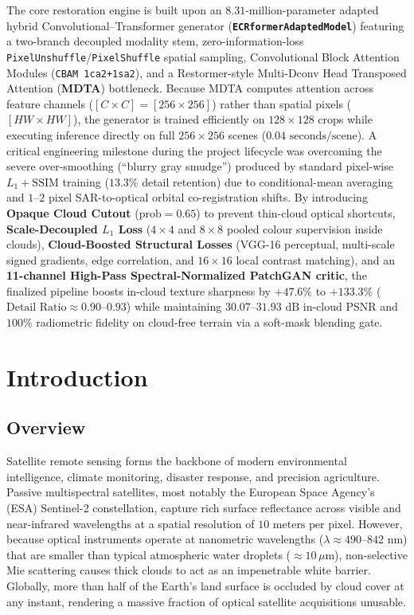 \documentclass[12pt,a4paper]{report}
\begin{document}
The core restoration engine is built upon an $8.31$-million-parameter adapted hybrid Convolutional--Transformer generator (\textbf{\texttt{ECRformerAdaptedModel}}) featuring a two-branch decoupled modality stem, zero-information-loss \texttt{PixelUnshuffle}/\texttt{PixelShuffle} spatial sampling, Convolutional Block Attention Modules (\texttt{CBAM 1ca2+1sa2}), and a Restormer-style Multi-Dconv Head Transposed Attention (\textbf{MDTA}) bottleneck. Because MDTA computes attention across feature channels ($[C\times C] = [256\times 256]$) rather than spatial pixels ($[HW\times HW]$), the generator is trained efficiently on $128\times 128$ crops while executing inference directly on full $256\times 256$ scenes ($0.04\text{ seconds/scene}$). A critical engineering milestone during the project lifecycle was overcoming the severe over-smoothing (``blurry gray smudge'') produced by standard pixel-wise $L_1 + \text{SSIM}$ training ($13.3\%$ detail retention) due to conditional-mean averaging and $1$--$2\text{ pixel}$ SAR-to-optical orbital co-registration shifts. By introducing \textbf{Opaque Cloud Cutout} ($\text{prob}=0.65$) to prevent thin-cloud optical shortcuts, \textbf{Scale-Decoupled $L_1$ Loss} ($4\times 4$ and $8\times 8$ pooled colour supervision inside clouds), \textbf{Cloud-Boosted Structural Losses} (VGG-16 perceptual, multi-scale signed gradients, edge correlation, and $16\times 16$ local contrast matching), and an \textbf{11-channel High-Pass Spectral-Normalized PatchGAN critic}, the finalized pipeline boosts in-cloud texture sharpness by $+47.6\%$ to $+133.3\%$ ($\text{Detail Ratio} \approx 0.90$--$0.93$) while maintaining $30.07$--$31.93\text{ dB}$ in-cloud PSNR and $100\%$ radiometric fidelity on cloud-free terrain via a soft-mask blending gate.

\newpage

\chapter{Introduction}

\section{Overview}
Satellite remote sensing forms the backbone of modern environmental intelligence, climate monitoring, disaster response, and precision agriculture. Passive multispectral satellites, most notably the European Space Agency's (ESA) Sentinel-2 constellation, capture rich surface reflectance across visible and near-infrared wavelengths at a spatial resolution of $10\text{ meters per pixel}$. However, because optical instruments operate at nanometric wavelengths ($\lambda \approx 490$--$842\text{ nm}$) that are smaller than typical atmospheric water droplets ($\approx 10\,\mu\text{m}$), non-selective Mie scattering causes thick clouds to act as an impenetrable white barrier. Globally, more than half of the Earth's land surface is occluded by cloud cover at any instant, rendering a massive fraction of optical satellite acquisitions unusable.
\end{document}
